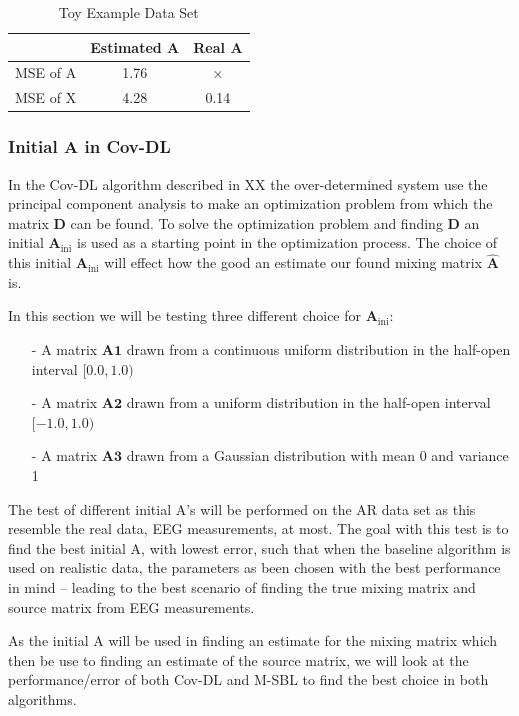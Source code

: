 \begin{table}[H]
\centering
\begin{tabular}{|c|c|c|}
\hline
         & Estimated A & Real A \\ \hline
MSE of A & 1.76 & $\times$ \\ 
\hline 
MSE of X & 4.28 & 0.14 \\ 
\hline
\end{tabular} 
\caption{Toy Example Data Set}
\end{table}

\subsubsection{Initial A in Cov-DL}
In the Cov-DL algorithm described in XX the over-determined system use the principal component analysis to make an optimization problem from which the matrix $\mathbf{D}$ can be found. To solve the optimization problem and finding $\mathbf{D}$ an initial $\mathbf{A}_{\text{ini}}$ is used as a starting point in the optimization process. The choice of this initial $\mathbf{A}_{\text{ini}}$ will effect how the good an estimate our found mixing matrix $\hat{\mathbf{A}}$ is.

In this section we will be testing three different choice for $\mathbf{A}_{\text{ini}}$:
\begin{itemize}
\item[-] A matrix $\mathbf{A1}$ drawn from a continuous uniform distribution in the half-open interval $[0.0, 1.0)$
\item[-] A matrix $\mathbf{A2}$ drawn from a uniform distribution in the half-open interval $[-1.0, 1.0)$
\item[-] A matrix $\mathbf{A3}$ drawn from a Gaussian distribution with mean 0 and variance 1
\end{itemize}
The test of different initial A's will be performed on the AR data set as this resemble the real data, EEG measurements, at most. The goal with this test is to find the best initial A, with lowest error, such that when the baseline algorithm is used on realistic data, the parameters as been chosen with the best performance in mind -- leading to the best scenario of finding the true mixing matrix and source matrix from EEG measurements.

As the initial A will be used in finding an estimate for the mixing matrix which then be use to finding an estimate of the source matrix, we will look at the performance/error of both Cov-DL and M-SBL to find the best choice in both algorithms.

